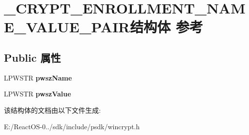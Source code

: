\hypertarget{struct___c_r_y_p_t___e_n_r_o_l_l_m_e_n_t___n_a_m_e___v_a_l_u_e___p_a_i_r}{}\section{\+\_\+\+C\+R\+Y\+P\+T\+\_\+\+E\+N\+R\+O\+L\+L\+M\+E\+N\+T\+\_\+\+N\+A\+M\+E\+\_\+\+V\+A\+L\+U\+E\+\_\+\+P\+A\+I\+R结构体 参考}
\label{struct___c_r_y_p_t___e_n_r_o_l_l_m_e_n_t___n_a_m_e___v_a_l_u_e___p_a_i_r}
\subsection*{Public 属性}
\begin{DoxyCompactItemize}
\item 
\mbox{\label{struct___c_r_y_p_t___e_n_r_o_l_l_m_e_n_t___n_a_m_e___v_a_l_u_e___p_a_i_r_ab26a56e32cc4ab3ec7eaf92afb6ff8ad}} 
L\+P\+W\+S\+TR {\bfseries pwsz\+Name}
\item 
\mbox{\label{struct___c_r_y_p_t___e_n_r_o_l_l_m_e_n_t___n_a_m_e___v_a_l_u_e___p_a_i_r_a0712bb3d1c629eba424d1ad4fd0a8842}} 
L\+P\+W\+S\+TR {\bfseries pwsz\+Value}
\end{DoxyCompactItemize}


该结构体的文档由以下文件生成\+:\begin{DoxyCompactItemize}
\item 
E\+:/\+React\+O\+S-\/0../sdk/include/psdk/wincrypt.\+h\end{DoxyCompactItemize}
